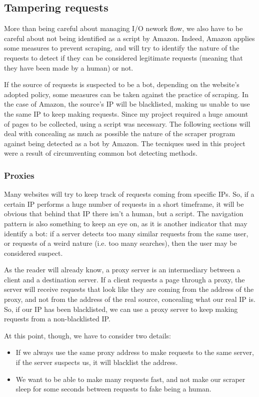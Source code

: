 \documentclass[LaM,oneside,binding=0.6cm]{sapthesis}
\begin{document}
\subsection{Tampering requests}

More than being careful about managing I/O nework flow, we also have to be careful about not being identified as a script by Amazon. Indeed, Amazon applies some measures to prevent scraping, and will try to identify the nature of the requests to detect if they can be considered legitimate requests (meaning that they have been made by a human) or not. 

If the source of requests is suspected to be a bot, depending on the website's adopted policy, some measures can be taken against the practice of scraping. In the case of Amazon, the source's IP will be blacklisted, making us unable to use the same IP to keep making requests. 
Since my project required a huge amount of pages to be collected, using a script was necessary. The following sections will deal with concealing as much as possible the nature of the scraper program against being detected as a bot by Amazon.
The tecniques used in this project were a result of circumventing common bot detecting methods.  
 
\subsubsection{Proxies}

Many websites will try to keep track of requests coming from specific IPs. So, if a certain IP performs a huge number of requests in a short timeframe, it will be obvious that behind that IP there isn't a human, but a script. The navigation pattern is also something to keep an eye on, as it is another indicator that may identify a bot: if a server detects too many similar requests from the same user, or requests of a weird nature (i.e. too many searches), then the user may be considered suspect.

As the reader will already know, a proxy server is an intermediary between a client and a destination server. If a client requests a page through a proxy, the server will receive requests that look like they are coming from the address of the proxy, and not from the address of the real source, concealing what our real IP is. So, if our IP has been blacklisted, we can use a proxy server to keep making requests from a non-blacklisted IP. 

At this point, though, we have to consider two details:
\begin{itemize}
	\item If we always use the same proxy address to make requests to the same server, if the server suspects us, it will blacklist the address.
	\item We want to be able to make many requests fast, and not make our scraper sleep for some seconds between requests to fake being a human. 
\end{itemize}
\end{document}
